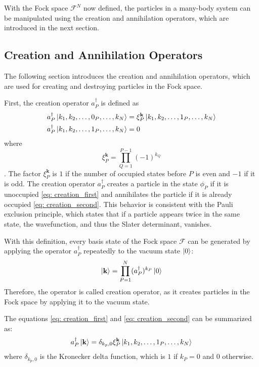 With the Fock space $\mathcal{F}^N$ now defined, the particles in a many-body system can be manipulated using the creation and annihilation operators, which are introduced in the next section.

\subsection{Creation and Annihilation Operators}

The following section introduces the creation and annihilation operators, which are used for creating and destroying particles in the Fock space.

First, the creation operator $a_P^{\dagger}$ is defined as
\begin{align}
    a_P^{\dagger} \ket{k_1, k_2, \ldots, 0_P, \ldots, k_N} &= \xi_P^{\mathbf{k}} \ket{k_1, k_2, \ldots, 1_P, \ldots, k_N} \label{eq: creation_first} \\
    a_P^{\dagger} \ket{k_1, k_2, \ldots, 1_P, \ldots, k_N} &= 0 \label{eq: creation_second}
\end{align}
where 
\begin{equation}
    \xi_P^{\mathbf{k}} = \prod_{Q=1}^{P-1} (-1)^{k_Q}
\end{equation}
\cite{Altland, Helgaker2000}. The factor $\xi_P^{\textbf{k}}$ is $1$ if the number of occupied states before $P$ is even and $-1$ if it is odd. The creation operator $a_P^{\dagger}$ creates a particle in the state $\phi_P$ if it is unoccupied \eqref{eq: creation_first} and annihilates the particle if it is already occupied \eqref{eq: creation_second}. This behavior is consistent with the Pauli exclusion principle, which states that if a particle appears twice in the same state, the wavefunction, and thus the Slater determinant, vanishes.

With this definition, every basis state of the Fock space $\mathcal{F}$ can be generated by applying the operator $a_P^{\dagger}$ repeatedly to the vacuum state $\ket{0}$:
\begin{equation}
    \ket{\mathbf{k}} =\prod_{P=1}^{N} (a_P^{\dagger})^{k_P} \ket{0}
\end{equation}
Therefore, the operator is called creation operator, as it creates particles in the Fock space by applying it to the vacuum state.

The equations \eqref{eq: creation_first} and \eqref{eq: creation_second} can be summarized as:
\begin{equation}
    a_P^{\dagger}\ket{\mathbf{k}} = \delta_{k_p, 0} \xi_P^{\mathbf{k}} \ket{k_1, k_2, \ldots, 1_P, \ldots, k_N}
\end{equation}
where $\delta_{k_p, 0}$ is the Kronecker delta function, which is $1$ if $k_P = 0$ and $0$ otherwise.

